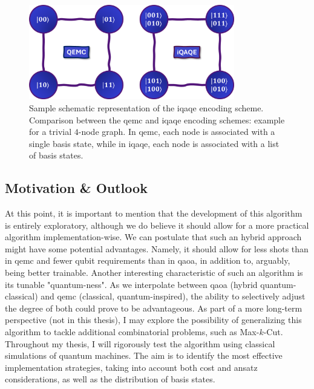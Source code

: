 \begin{figure}[H]
    \centering
    \includegraphics[width=0.8\textwidth]{Figures/Diagrams/QEMC_iQAQE_Encodings.png}
    \caption{Sample schematic representation of the \acrshort{iqaqe} encoding scheme. Comparison between the \acrshort{qemc} and \acrshort{iqaqe} encoding schemes: example for a trivial $4$-node graph. In \acrshort{qemc}, each node is associated with a single basis state, while in \acrshort{iqaqe}, each node is associated with a list of basis states.}
\label{fig:iQAQE_Encoding}
\end{figure}

\subsection{Motivation \& Outlook}
\label{subsection:iQAQE Motivation}
At this point, it is important to mention that the development of this algorithm is entirely exploratory, although we do believe it should allow for a more practical algorithm implementation-wise. We can postulate that such an hybrid approach might have some potential advantages. Namely, it should allow for less shots than in \acrshort{qemc} and fewer qubit requirements than in \acrshort{qaoa}, in addition to, arguably, being better trainable. Another interesting characteristic of such an algorithm is its tunable "quantum-ness". As we interpolate between \acrshort{qaoa} (hybrid quantum-classical) and \acrshort{qemc} (classical, quantum-inspired), the ability to selectively adjust the degree of both could prove to be advantageous. As part of a more long-term perspective (not in this thesis), I may explore the possibility of generalizing this algorithm to tackle additional combinatorial problems, such as Max-$k$-Cut. Throughout my thesis, I will rigorously test the algorithm using classical simulations of quantum machines. The aim is to identify the most effective implementation strategies, taking into account both cost and ansatz considerations, as well as the distribution of basis states.

